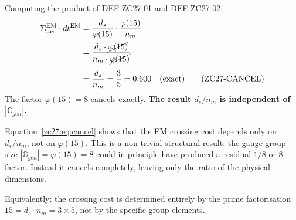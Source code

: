 \documentclass[12pt, a4paper]{article}
\begin{document}
\begin{derivedbox}[title={FIND-ZC27-03: $\Sigma_{\rm inv}^{\rm EM}
  \cdot dt^{\rm EM} = d_s/n_m$ --- The $\varphi$-Cancellation}]
Computing the product of DEF-ZC27-01 and DEF-ZC27-02:
\begin{align}
  \Sigma_{\rm inv}^{\rm EM} \cdot dt^{\rm EM}
  &= \frac{d_s}{\varphi(15)} \cdot \frac{\varphi(15)}{n_m}
  \notag\\
  &= \frac{d_s \cdot \cancel{\varphi(15)}}{n_m \cdot \cancel{\varphi(15)}}
  \notag\\[4pt]
  &= \frac{d_s}{n_m}
  = \frac{3}{5}
  = 0.600 \quad \text{(exact)}
  \tag{ZC27-CANCEL}\label{zc27:eq:cancel}
\end{align}
The factor $\varphi(15) = 8$ cancels exactly.
\textbf{The result $d_s/n_m$ is independent of $|\mathbb{G}_{gen}|$.}
\end{derivedbox}

\begin{derivedbox}[title={FIND-ZC27-05: $T(R_1)_{\rm EM}$ is
  $\mathbb{G}_{gen}$-Size Independent}]
Equation~\eqref{zc27:eq:cancel} shows that the EM crossing cost
depends only on $d_s/n_m$, not on $\varphi(15)$.
This is a non-trivial structural result: the gauge group
size $|\mathbb{G}_{gen}| = \varphi(15) = 8$ could in
principle have produced a residual $1/8$ or $8$ factor.
Instead it cancels completely, leaving only the ratio
of the physical dimensions.

Equivalently: the crossing cost is determined entirely by
the prime factorisation $15 = d_s \cdot n_m = 3 \times 5$,
not by the specific group elements.
\end{derivedbox}
\end{document}
